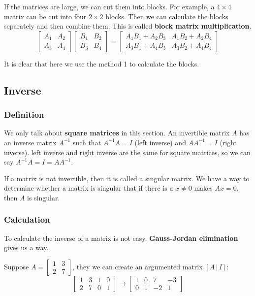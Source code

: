 \documentclass[12pt]{ctexart}
\begin{document}
If the matrices are large, we can cut them into blocks. For example, a $4 \times 4$
matrix can be cut into four $2 \times 2$ blocks. Then we can calculate the blocks
separately and then combine them. This is called \textbf{block matrix multiplication}.
\[
  \begin{bmatrix}
    A_{1} & A_{2} \\
    A_{3} & A_{4}
  \end{bmatrix}
  \begin{bmatrix}
    B_{1} & B_{2} \\
    B_{3} & B_{4}
  \end{bmatrix}
  =
  \begin{bmatrix}
    A_{1}B_{1} + A_{2}B_{3} & A_{1}B_{2} + A_{2}B_{4} \\
    A_{3}B_{1} + A_{4}B_{3} & A_{3}B_{2} + A_{4}B_{4}
  \end{bmatrix}
\]

It is clear that here we use the method 1 to calculate the blocks.

\subsection{\textbf{Inverse}}
\subsubsection{\textbf{Definition}}

We only talk about \textbf{square matrices} in this section. An invertible matrix $A$
has an inverse matrix $A^{-1}$ such that $A^{-1}A = I$ (left inverse) and $AA^{-1} = I$
(right inverse). left inverse and right inverse are the same for square matrices, so we
can say $A^{-1}A = I = AA^{-1}$.

If a matrix is not invertible, then it is called a singular matrix. We have a way to
determine whether a matrix is singular that if there is a $x \neq 0$ makes $Ax = 0$,
then $A$ is singular.

\subsubsection{\textbf{Calculation}}

To calculate the inverse of a matrix is not easy. \textbf{Gauss-Jordan elimination}
gives us a way.

Suppose $A = \begin{bmatrix} 1 & 3 \\ 2 & 7 \end{bmatrix}$, they we can create an
argumented matrix $[A\,|\,I]$:
\[
  \left[
  \begin{array}{cc|cc}
    1 & 3 & 1 & 0 \\
    2 & 7 & 0 & 1
  \end{array}
  \right]
  \rightarrow
  \left[
  \begin{array}{cc|cc}
    1 & 0 & 7 & -3 \\
    0 & 1 & -2 & 1
  \end{array}
  \right]
\]
\end{document}
